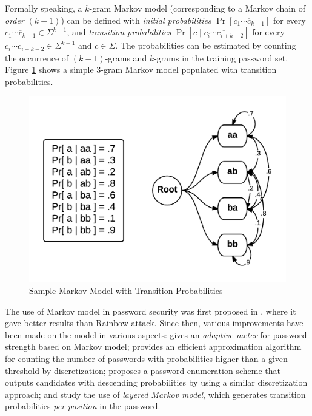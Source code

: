 \documentclass{article} %
\theoremstyle{definition}
\theoremstyle{theorem}
\theoremstyle{remark}
\theoremstyle{remark}
\begin{document}
\par\quad Formally speaking, a $k$-gram Markov model (corresponding to a Markov chain of \emph{order} $(k-1)$) can be defined with \emph{initial probabilities} $\Pr[\overline{c_1\cdots c_{k-1}}]$ for every $\overline{c_1\cdots c_{k-1}} \in \Sigma^{k-1}$, and \emph{transition probabilities} $\Pr[c \mid \overline{c_{i}\cdots c_{i+k-2}}]$ for every $\overline{c_{i}\cdots c_{i+k-2}} \in \Sigma^{k-1}$ and $c\in \Sigma$. The probabilities can be estimated by counting the occurrence of $(k-1)$-grams and $k$-grams in the training password set. Figure \ref{fig:markov} shows a simple $3$-gram Markov model populated with transition probabilities.

    \begin{figure}[!htbp]
        \vspace{-30pt}
        \begin{center}
            \includegraphics[width=.6\textwidth]{diag/markov.png}
        \end{center}
        \vspace{-20pt}
        \caption{Sample Markov Model with Transition Probabilities}
        \label{fig:markov}
    \end{figure}

\par\quad The use of Markov model in password security was first proposed in \cite{timespace}, where it gave better results than Rainbow attack. Since then, various improvements have been made on the model in various aspects: \cite{adaptive markov} gives an \emph{adaptive meter} for password strength based on Markov model; \cite{empirical} provides an efficient approximation algorithm for counting the number of passwords with probabilities higher than a given threshold by discretization; \cite{omen} proposes a password enumeration scheme that outputs candidates with descending probabilities by using a similar discretization approach; \cite{probframework} and \cite{passmodel} study the use of \emph{layered Markov model}, which generates transition probabilities \emph{per position} in the password.
\end{document}
